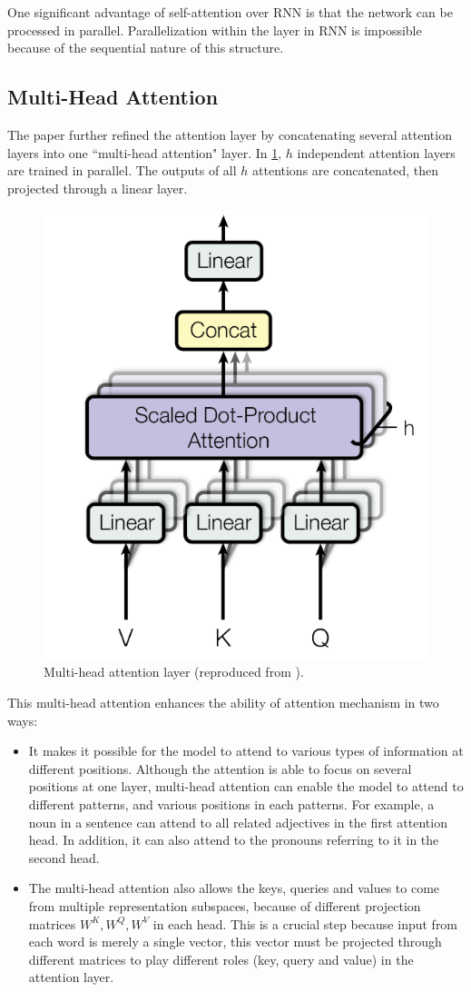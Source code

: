 One significant advantage of self-attention over RNN is that the network can be processed in parallel. Parallelization within the layer in RNN is impossible because of the sequential nature of this structure.

\subsection{Multi-Head Attention}

The paper further refined the attention layer by concatenating several attention layers into one ``multi-head attention" layer.
In \cref{fig:multihead-attention-layer}, $h$ independent attention layers are trained in parallel.
The outputs of all $h$ attentions are concatenated, then projected through a linear layer.

\begin{figure}[t]
    \centering
    \includegraphics[width=0.5\linewidth]{img/multihead-attention.png}
    \caption{Multi-head attention layer (reproduced from \cite{DBLP:conf/nips/VaswaniSPUJGKP17}).}
    \label{fig:multihead-attention-layer}
\end{figure}

This multi-head attention enhances the ability of attention mechanism in two ways:
\begin{itemize}
    \item It makes it possible for the model to attend to various types of information at different positions. Although the attention is able to focus on several positions at one layer, multi-head attention can enable the model to attend to different patterns, and various positions in each patterns.
    For example, a noun in a sentence can attend to all related adjectives in the first attention head. In addition, it can also attend to the pronouns referring to it in the second head.
    \item The multi-head attention also allows the keys, queries and values to come from multiple representation subspaces, because of different projection matrices $W^K, W^Q, W^V$ in each head. This is a crucial step because input from each word is merely a single vector, this vector must be projected through different matrices to play different roles (key, query and value) in the attention layer.
\end{itemize}

